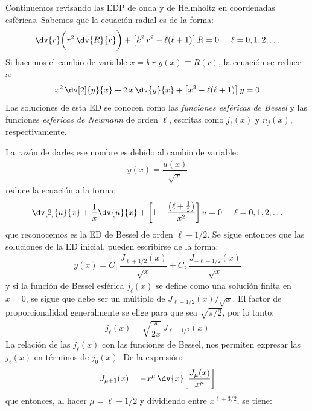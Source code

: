 Continuemos revisando las EDP de onda y de Helmholtz en coordenadas esféricas. Sabemos que la ecuación radial es de la forma:
\begin{align*}
\dv{r} \bigg( r^{2} \, \dv{R}{r} \bigg) + \big[ k^{2} \, r^{2} - \ell (\ell + 1) \big] \, R = 0 \hspace{0.5cm} \ell = 0, 1, 2, \ldots
\end{align*}
Si hacemos el cambio de variable $x = k \, r$ $y (x) \equiv R (r)$, la ecuación se reduce a:
\begin{align*}
x^{2} \, \dv[2]{y}{x} + 2 \, x \, \dv{y}{x} + \big[ x^{2} - \ell (\ell + 1) \big] \, y = 0
\end{align*}
Las soluciones de esta ED se conocen como las \emph{funciones esféricas de Bessel} y las funciones \emph{esféricas de Neumann} de orden $\ell$, escritas como $j_{\ell} (x)$ y $n_{j} (x)$, respectivamente.
\par
La razón de darles ese nombre es debido al cambio de variable:
\begin{align*}
y (x) = \dfrac{u (x)}{\sqrt{x}}
\end{align*}
reduce la ecuación a la forma:
\begin{align*}
\dv[2]{u}{x} + \dfrac{1}{x} \dv{u}{x} + \bigg[ 1 - \dfrac{\big( \ell + \frac{1}{2} \big)}{x^{2}} \bigg] \, u = 0 \hspace{0.5cm} \ell = 0, 1, 2, \ldots
\end{align*}
que reconocemos es la ED de Bessel de orden $\ell + 1/2$. Se sigue entonces que las soluciones de la ED inicial, pueden escribirse de la forma:
\begin{align*}
y (x) = C_{1} \, \dfrac{J_{\ell+1/2} (x)}{\sqrt{x}} + C_{2} \, \dfrac{J_{-\ell-1/2} (x)}{\sqrt{x}}
\end{align*}
y si la función de Bessel esférica $j_{\ell} (x)$ se define como una solución finita en $x = 0$, se sigue que debe ser un múltiplo de $J_{\ell+1/2} (x) / \sqrt{x}$. El factor de proporcionalidad generalmente se elige para que sea $\sqrt{\pi/2}$, por lo tanto:
\begin{align*}
j_{\ell} (x) = \sqrt{\dfrac{\pi}{2 x}} \, J_{\ell+1/2} (x)
\end{align*}
La relación de las $j_{\ell} (x)$ con las funciones de Bessel, nos permiten expresar las $j_{\ell} (x)$ en términos de $j_{0} (x)$. De la expresión:
\begin{align*}
J_{\mu+1} (x) = - x^{\mu} \, \dv{x} \bigg[ \dfrac{J_{\mu} (x)}{x^{\mu}} \bigg]
\end{align*}
que entonces, al hacer $\mu = \ell + 1/2$ y dividiendo entre $x^{\ell+3/2}$, se tiene:
